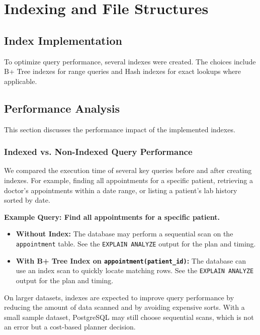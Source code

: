 \section{Indexing and File Structures}

\subsection{Index Implementation}
To optimize query performance, several indexes were created. The choices include B+ Tree indexes for range queries and Hash indexes for exact lookups where applicable.



\subsection{Performance Analysis}
This section discusses the performance impact of the implemented indexes.

\subsubsection{Indexed vs. Non-Indexed Query Performance}
We compared the execution time of several key queries before and after creating indexes. For example, finding all appointments for a specific patient, retrieving a doctor's appointments within a date range, or listing a patient's lab history sorted by date.

\textbf{Example Query: Find all appointments for a specific patient.}
\begin{itemize}
    \item \textbf{Without Index:} The database may perform a sequential scan on the \texttt{appointment} table. See the \texttt{EXPLAIN ANALYZE} output for the plan and timing.
    \item \textbf{With B+ Tree Index on \texttt{appointment(patient\_id)}:} The database can use an index scan to quickly locate matching rows. See the \texttt{EXPLAIN ANALYZE} output for the plan and timing.
\end{itemize}

On larger datasets, indexes are expected to improve query performance by reducing the amount of data scanned and by avoiding expensive sorts. With a small sample dataset, PostgreSQL may still choose sequential scans, which is not an error but a cost-based planner decision.
